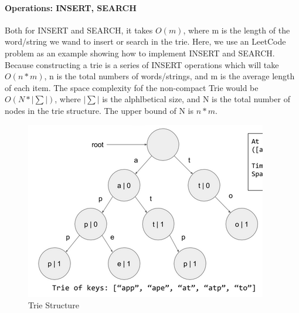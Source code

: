 \documentclass[../main.tex]{subfiles}
\begin{document}
\paragraph{Operations: INSERT, SEARCH}
Both for INSERT and SEARCH, it takes $O(m)$, where m is the length of the word/string we wand to insert or search in the trie. Here, we use an LeetCode problem as an example showing how to implement INSERT and SEARCH. Because constructing a trie is a series of INSERT operations which will take $O(n*m)$, n is the total numbers of words/strings, and m is the average length of each item. The space complexity fof the non-compact Trie would be $O(N*|\sum|)$, where $|\sum|$ is the alphlbetical size, and N is the total number of nodes in the trie structure. The upper bound of N is $n*m$. 
\begin{figure}[h]
    \centering
    \includegraphics[width=0.6\columnwidth]{fig/Trie.png}
    \caption{Trie Structure}
    \label{fig:trie}
\end{figure}
\end{document}
